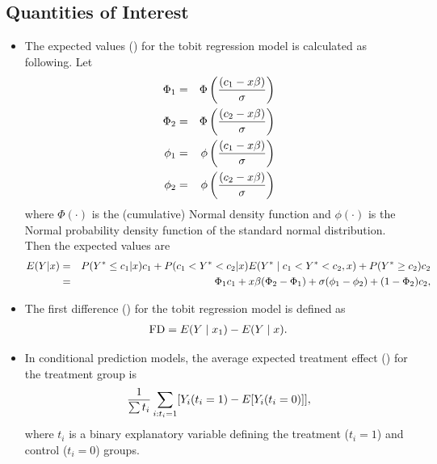 \documentclass[letterpaper,10pt,english]{sphinxmanual}
\begin{document}
\subsection{Quantities of Interest}
\label{vignette:id115}\begin{itemize}
\item {} 
The expected values () for the tobit regression model is
calculated as following. Let
\begin{gather}
\begin{split}\begin{aligned}
\Phi_1 &=& \Phi\left(\frac{(c_1 - x \beta)}{\sigma}\right) \\
\Phi_2 &=& \Phi\left(\frac{(c_2 - x \beta)}{\sigma}\right) \\
\phi_1 &=& \phi\left(\frac{(c_1 - x \beta)}{\sigma}\right) \\
\phi_2 &=& \phi\left(\frac{(c_2 - x \beta)}{\sigma}\right) \end{aligned}\end{split}\notag
\end{gather}
where \(\Phi(\cdot)\) is the (cumulative) Normal density function
and \(\phi(\cdot)\) is the Normal probability density function of
the standard normal distribution. Then the expected values are
\begin{gather}
\begin{split}\begin{aligned}
E(Y|x) &=& P(Y^* \le c_1|x) c_1+P(c_1<Y^*<c_2|x) E(Y^* \mid c_1<Y^*<c_2, x)+P(Y^* \ge c_2) c_2 \\
   &=& \Phi_{1}c_1 + x \beta(\Phi_{2}-\Phi_{1}) + \sigma (\phi_1 -\phi_2) + (1-\Phi_2) c_2,\end{aligned}\end{split}\notag
\end{gather}
\item {} 
The first difference () for the tobit regression model is
defined as
\begin{gather}
\begin{split}\begin{aligned}
\text{FD}=E(Y\mid x_{1})-E(Y\mid x).\end{aligned}\end{split}\notag
\end{gather}
\item {} 
In conditional prediction models, the average expected treatment
effect () for the treatment group is
\begin{gather}
\begin{split}\begin{aligned}
\frac{1}{\sum t_{i}}\sum_{i:t_{i}=1}[Y_{i}(t_{i}=1)-E[Y_{i}(t_{i}=0)]],\end{aligned}\end{split}\notag
\end{gather}
where \(t_{i}\) is a binary explanatory variable defining the
treatment (\(t_{i}=1\)) and control (\(t_{i}=0\)) groups.

\end{itemize}
\end{document}

